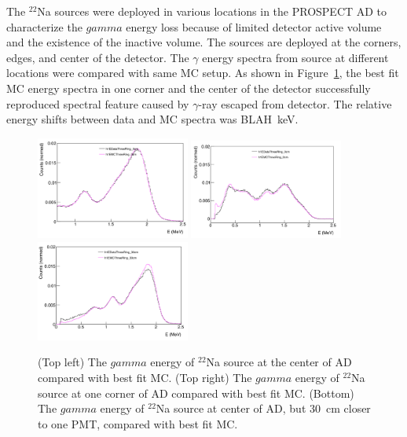 \documentclass{article}
\begin{document}
The $^{22}$Na sources were deployed in various locations in the PROSPECT AD to characterize the $gamma$ energy loss because of limited detector active volume and the existence of the inactive volume. 
The sources are deployed at the corners, edges, and center of the detector.
The $\gamma$ energy spectra from source at different locations were compared with same MC setup.
As shown in Figure~\ref{fig:eloss}, the best fit MC energy spectra in one corner and the center of the detector successfully reproduced spectral feature caused by $\gamma$-ray escaped from detector.
The relative energy shifts between data and MC spectra was BLAH~keV. 

\begin{figure}[h!]
\centering
\includegraphics[width=0.45\textwidth]{elosscenter.png}
\includegraphics[width=0.45\textwidth]{elosscorner.png}
\includegraphics[width=0.45\textwidth]{eloss30.png}
\caption{
(Top left) The $gamma$ energy of $^{22}$Na source at the center of AD compared with best fit MC.
(Top right) The $gamma$ energy of $^{22}$Na source at one corner of AD compared with best fit MC.
(Bottom) The $gamma$ energy of $^{22}$Na source at center of AD, but 30~cm closer to one PMT, compared with best fit MC.}
\label{fig:eloss}
\end{figure}
\end{document}
